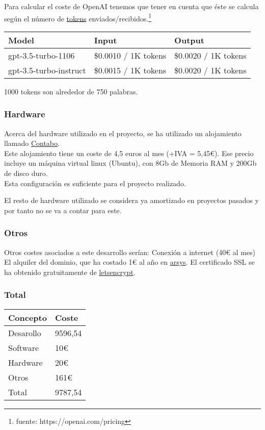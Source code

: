 Para calcular el coste de OpenAI tenemos que tener en cuenta que éste se calcula según el 
número de \href{https://platform.openai.com/tokenizer}{tokens} enviados/recibidos.\footnote{fuente: https://openai.com/pricing} \\


\begin{tabular}{l l l}
    \hline
    \textbf{Model}&\textbf{Input}&\textbf{Output}\\ \hline
    gpt-3.5-turbo-1106 & \$0.0010 / 1K tokens & \$0.0020 / 1K tokens\\ \hline
    gpt-3.5-turbo-instruct & \$0.0015 / 1K tokens & \$0.0020 / 1K tokens\\ \hline       
\end{tabular}

1000 tokens son alrededor de 750 palabras.

\subsubsection{Hardware}
Acerca del hardware utilizado en el proyecto, se ha utilizado un alojamiento llamado \href{https://contabo.com/en/}{Contabo}.\\
Este alojamiento tiene un coste de 4,5 euros al mes (+IVA = 5,45€). 
Ese precio incluye un máquina virtual linux (Ubuntu),
con 8Gb de Memoria RAM y 200Gb de disco duro.\\
Esta configuración es suficiente para el proyecto realizado.

El resto de hardware utilizado se considera ya amortizado en proyectos 
pasados y por tanto no se va a contar para este.


\subsubsection{Otros}

Otros costes asociados a este desarrollo serían:
Conexión a internet (40€ al mes)
El alquiler del dominio, que ha costado 1€ al año en \href{https://www.arsys.es/}{arsys}.
El certificado SSL se ha obtenido gratuitamente de \href{https://letsencrypt.org/}{letsencrypt}.

\subsubsection{Total}

\begin{tabular}{l l}
    \hline
    \textbf{Concepto} & \textbf{Coste}\\ \hline
    Desarollo &  9596,54\\ \hline
    Software & 10€\\ \hline
    Hardware & 20€\\ \hline
    Otros & 161€\\ \hline
    Total & 9787,54\\ \hline
\end{tabular}

